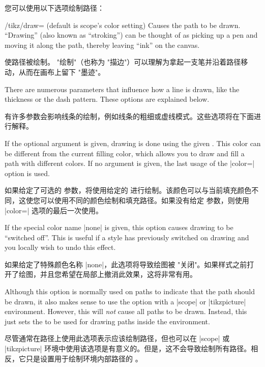 您可以使用以下选项绘制路径：
%
\begin{key}{/tikz/draw= (default \normalfont is scope's color setting)}
    Causes the path to be drawn. ``Drawing'' (also known as ``stroking'') can
    be thought of as picking up a pen and moving it along the path, thereby
    leaving ``ink'' on the canvas.

    使路径被绘制。 "绘制"（也称为 "描边"）可以理解为拿起一支笔并沿着路径移动，从而在画布上留下 "墨迹"。


    There are numerous parameters that influence how a line is drawn, like the
    thickness or the dash pattern. These options are explained below.

    有许多参数会影响线条的绘制，例如线条的粗细或虚线模式。这些选项将在下面进行解释。


    If the optional  argument is given, drawing is done using the
    given . This color can be different from the current filling
    color, which allows you to draw and fill a path with different colors. If
    no  argument is given, the last usage of the |color=| option is
    used.
    
    如果给定了可选的  参数，将使用给定的  进行绘制。该颜色可以与当前填充颜色不同，这使您可以使用不同的颜色绘制和填充路径。如果没有给定  参数，则使用 |color=| 选项的最后一次使用。

    If the special color name |none| is given, this option causes drawing to be
    ``switched off''. This is useful if a style has previously switched on
    drawing and you locally wish to undo this effect.

    如果给定了特殊颜色名称 |none|，此选项将导致绘图被 "关闭"。如果样式之前打开了绘图，并且您希望在局部上撤消此效果，这将非常有用。

    Although this option is normally used on paths to indicate that the path
    should be drawn, it also makes sense to use the option with a |{scope}| or
    |{tikzpicture}| environment. However, this will \emph{not} cause all paths
    to be drawn. Instead, this just sets the  to be used for
    drawing paths inside the environment.

    尽管通常在路径上使用此选项表示应该绘制路径，但也可以在 |{scope}| 或 |{tikzpicture}| 环境中使用该选项是有意义的。但是，这不会导致绘制所有路径。相反，它只是设置用于绘制环境内部路径的 。

\begin{codeexample}[]
\end{codeexample}
\end{key}

